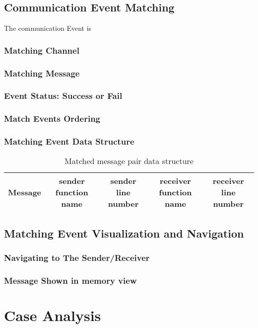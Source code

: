 \documentclass[paper=a4, fontsize=11pt]{scrartcl}
\numberwithin{equation}{section}		%
\numberwithin{figure}{section}			%
\numberwithin{table}{section}				%
\begin{document}
\subsection{Communication Event Matching}
The communication Event is 
\subsubsection{Matching Channel}
\subsubsection{Matching Message}
\subsubsection{Event Status: Success or Fail}
\subsubsection{Match Events Ordering}
\subsubsection{Matching Event Data Structure}
\begin{table}[h]
 \begin{center}
  \caption{Matched message pair data structure}
\label{table2}
\begin{tabular}{|c|c|c|c|c|}
      \hline
         Message& sender function name & sender line number  & receiver function name & receiver line number \\
       \hline
\end{tabular}
\end{center}
\end{table}
\subsection{Matching Event Visualization and Navigation}
\subsubsection{Navigating to The Sender/Receiver}
\subsubsection{Message Shown in memory view}



\section{Case Analysis}
\end{document}
